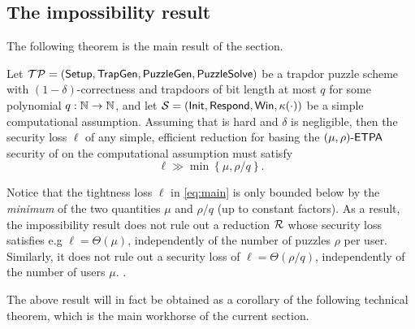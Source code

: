 \subsection{The impossibility result}

The following theorem is the main result of the section.

\begin{theorem}\label{thm:main}
  Let \(\mathcal{TP} = (\mathsf{Setup},\allowbreak \mathsf{TrapGen},\allowbreak \mathsf{PuzzleGen},\allowbreak \mathsf{PuzzleSolve})\)
  be a trapdor puzzle scheme with \((1-\delta)\)-correctness
  and trapdoors of bit length at most \(q\) for some polynomial \(q : \mathbb{N} \to \mathbb{N}\),
  and let \(\mathcal{S} = (\mathsf{Init},\allowbreak \mathsf{Respond},\allowbreak \mathsf{Win},\allowbreak \kappa(\cdot))\)
  be a simple computational assumption.
  Assuming that \Simple is hard and \(\delta\) is negligible,
  then the security loss \(\ell\) of any simple, efficient reduction \redR
  for basing the \((\mu,\rho)\text{-}\mathsf{ETPA}\) security of \TP
  on the computational assumption \Simple must satisfy
  \begin{equation}\label{eq:main}
    \ell \gg \min \left\{ \mu, \rho / q \right\}.
  \end{equation}
\end{theorem}

Notice that the tightness loss \(\ell\) in \eqref{eq:main} is only bounded below by
the \emph{minimum} of the two quantities \(\mu\) and \(\rho/q\) (up to constant factors).
As a result, the impossibility result does not rule out a reduction \(\redR\)
whose security loss satisfies e.g \(\ell = \Theta(\mu)\), independently of the number of puzzles \(\rho\)
per user. Similarly, it does not rule out a security loss of
\(\ell = \Theta(\rho / q)\), independently of the number of users \(\mu\).
.

The above result will in fact be obtained as a corollary
of the following technical theorem,
which is the main workhorse of the current section.

